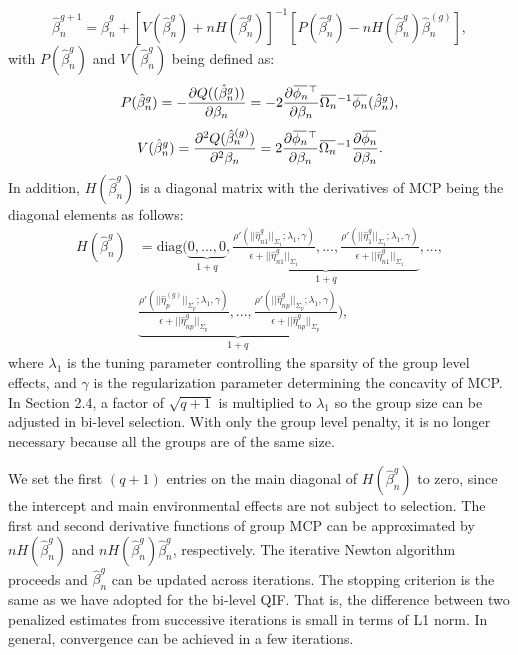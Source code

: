 \documentclass[12pt]{article}
\newcommand{\overbar}[1]{\mkern 1.5mu\overline{\mkern-1.5mu#1\mkern-1.5mu}\mkern 1.5mu}
\begin{document}
\begin{equation*}
	\hat{\beta}_{n}^{g+1}=\hat{\beta}_{n}^{g}+[V(\hat{\beta}_{n}^{g})+nH(\hat{\beta}_{n}^{g})]^{-1}[P(\hat{\beta}_{n}^{g})-nH(\hat{\beta}_{n}^{g})\hat{\beta}_{n}^{(g)}],
\end{equation*}
with $P(\hat{\beta}_{n}^{g})$ and $V(\hat{\beta}_{n}^{g})$ being defined as:
\begin{equation*}
	P(\hat{\beta}_{n}^{g})=-\frac{\partial Q((\hat{\beta}_{n}^{g}))}{\partial \beta_n}=-2\frac{\partial \overbar{\phi_n}^\top}{\partial \beta_n} \overbar{\Omega_n}^{-1}\overbar{\phi_n}(\hat{\beta}_{n}^{g}),
\end{equation*}
\begin{equation*}
	V(\hat{\beta}_{n}^{g})=\frac{\partial^2 Q(\hat{\beta}_{n}^{(g)})}{\partial^2 \beta_n}=2\frac{\partial \overbar{\phi_n}^\top}{\partial \beta_n} \overbar{\Omega_n}^{-1}\frac{\partial \overbar{\phi_n}}{\partial \beta_n}.
\end{equation*}
In addition, $H(\hat{\beta}_{n}^{g})$ is a diagonal matrix with the derivatives of MCP being the diagonal elements as follows:
\begin{equation*}
	\begin{aligned}
		H(\hat{\beta}_{n}^{g})&=\text{diag}(\underbrace{0,...,0}_{1+q},\underbrace{\frac{\rho'(||\hat{\eta}_{n1}^{g}||_{\Sigma_{1}};\lambda_{1},\gamma)}{\epsilon+||\hat{\eta}_{n1}^{g}||_{\Sigma_{1}}},...,\frac{\rho'(||\hat{\eta}_{1}^{g}||_{\Sigma_{1}};\lambda_{1},\gamma)}{\epsilon+||\hat{\eta}_{n1}^{g}||_{\Sigma_{1}}}}_{1+q},...,\\ &\underbrace{\frac{\rho'(||\hat{\eta}_{p}^{(g)}||_{\Sigma_{p}};\lambda_{1},\gamma)}{\epsilon+||\hat{\eta}_{np}^{g}||_{\Sigma_{p}}},...,\frac{\rho'(||\hat{\eta}_{np}^{g}||_{\Sigma_{p}};\lambda_{1},\gamma)}{\epsilon+||\hat{\eta}_{np}^{g}||_{\Sigma_{p}}}}_{1+q}),
	\end{aligned}
\end{equation*}
where $\lambda_1$ is the tuning parameter controlling the sparsity of the group level effects, and $\gamma$ is the regularization parameter determining the concavity of MCP. In Section 2.4, a factor of $\sqrt{q+1}$ is multiplied to $\lambda_1$ so the group size can be adjusted in bi-level selection. With only the group level penalty, it is no longer necessary because all the groups are of the same size.

We set the first $(q+1)$ entries on the main diagonal of $H(\hat{\beta}_{n}^{g})$ to zero, since the intercept and main environmental effects are not subject to selection. The first and second derivative functions of group MCP can be approximated by $nH(\hat{\beta}_{n}^{g})$ and $nH(\hat{\beta}_{n}^{g})\hat{\beta}_{n}^{g}$, respectively. The iterative Newton algorithm proceeds and $\hat{\beta}_{n}^{g}$ can be updated across iterations. The stopping criterion is the same as we have adopted for the bi-level QIF. That is, the difference between two penalized estimates from successive iterations is small in terms of L1 norm. In general, convergence can be achieved in a few iterations. 
\end{document}
